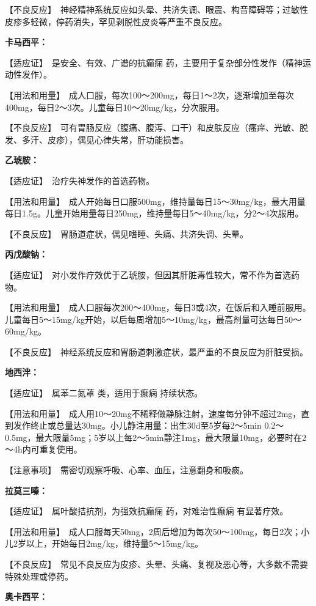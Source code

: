 【不良反应】　神经精神系统反应如头晕、共济失调、眼震、构音障碍等；过敏性皮疹多轻微，停药消失，罕见剥脱性皮炎等严重不良反应。

\textbf{卡马西平：}

【适应证】　是安全、有效、广谱的抗癫痫
药，主要用于复杂部分性发作（精神运动性发作）。

【用法和用量】　成人口服，每次100～200mg，每日1～2次，逐渐增加至每次400mg，每日2～3次。儿童每日10～20mg/kg，分次服用。

【不良反应】　可有胃肠反应（腹痛、腹泻、口干）和皮肤反应（瘙痒、光敏、脱发、多汗、皮疹），偶见心律失常，肝功能损害。

\textbf{乙琥胺：}

【适应证】　治疗失神发作的首选药物。

【用法和用量】　成人开始每日口服500mg，维持量每日15～30mg/kg，最大用量每日1.5g。儿童开始用量每日250mg，维持量每日5～40mg/kg，分2～4次服用。

【不良反应】　胃肠道症状，偶见嗜睡、头痛、共济失调、头晕。

\textbf{丙戊酸钠：}

【适应证】　对小发作疗效优于乙琥胺，但因其肝脏毒性较大，常不作为首选药物。

【用法和用量】　成人口服每次200～400mg，每日3或4次，在饭后和入睡前服用。儿童每日5～15mg/kg开始，以后每周增加5～10mg/kg，最高剂量可达每日50～60mg/kg。

【不良反应】　神经系统反应和胃肠道刺激症状，最严重的不良反应为肝脏受损。

\textbf{地西泮：}

【适应证】　属苯二氮䓬
类，适用于癫痫 持续状态。

【用法和用量】　成人用10～20mg不稀释做静脉注射，速度每分钟不超过2mg，直到发作终止或总量达30mg。小儿静注用量：出生30d至5岁每2～5min
0.2～0.5mg，最大限量5mg；5岁以上每2～5min静注1mg，最大限量10mg，必要时在2～4h内可重复使用。

【注意事项】　需密切观察呼吸、心率、血压，注意翻身和吸痰。

\textbf{拉莫三嗪：}

【适应证】　属叶酸拮抗剂，为强效抗癫痫
药，对难治性癫痫 有显著疗效。

【用法和用量】　成人口服每天50mg，2周后增加为每次50～100mg，每日2次；小儿2岁以上，开始每日2mg/kg，维持量5～15mg/kg。

【不良反应】　常见不良反应为皮疹、头晕、头痛、复视及恶心等，大多数不需要特殊处理或停药。

\textbf{奥卡西平：}

